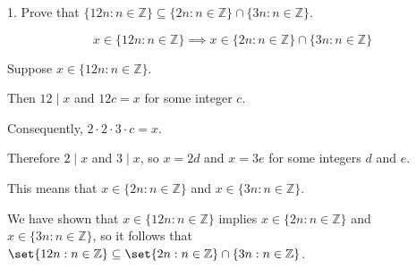 \documentclass{hippoidC}
\begin{document}
\toc

\begin{prooflist}{1. Prove that $\{12 n: n \in \mathbb{Z}\} \subseteq\{2 n: n \in \mathbb{Z}\} \cap\{3 n: n \in \mathbb{Z}\}$.}
\item

\[
x \in \{12 n: n \in \mathbb{Z}\}
\implies
x \in \{2 n: n \in \mathbb{Z}\} \cap\{3 n: n \in \mathbb{Z}\}
\]
\item Suppose $x \in \{12 n: n \in \mathbb{Z}\}$.
\item Then $12 \mid x$ and $12c=x$
    for some integer $c$.
\item Consequently, $2\cdot2\cdot3\cdot c =x$.
\item Therefore $2\mid x$ and $3\mid x$, so $x =2d$ and $x=3e$ for some integers
    $d$ and $e$.
\item
This means that $x \in \{2 n: n \in \mathbb{Z}\}$ and $x \in \{3 n: n \in
    \mathbb{Z}\}$.
\item
We have shown that
$x \in \{12 n: n \in \mathbb{Z}\}$
implies
$x \in\{2n: n \in \mathbb{Z}\}$
and
$x \in\{3n: n \in \mathbb{Z}\}$,
so it follows that
$\set{12 n: n \in \mathbb{Z}} \subseteq\set{2 n: n \in \mathbb{Z}} \cap\{3 n: n \in
\mathbb{Z}\}$.
\end{prooflist}
\end{document}
